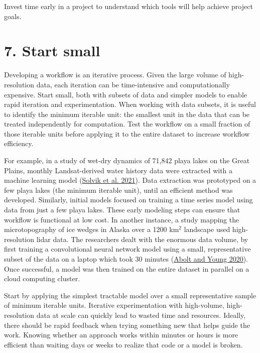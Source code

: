 \documentclass[
  12pt,
]{article}
\begin{document}
Invest time early in a project to understand which tools will help
achieve project goals.

\hypertarget{start-small}{%
\section{7. Start small}\label{start-small}}

Developing a workflow is an iterative process. Given the large volume of
high-resolution data, each iteration can be time-intensive and
computationally expensive. Start small, both with subsets of data and
simpler models to enable rapid iteration and experimentation. When
working with data subsets, it is useful to identify the minimum iterable
unit: the smallest unit in the data that can be treated independently
for computation. Test the workflow on a small fraction of those iterable
units before applying it to the entire dataset to increase workflow
efficiency.

For example, in a study of wet-dry dynamics of 71,842 playa lakes on the
Great Plains, monthly Landsat-derived water history data were extracted
with a machine learning model
(\protect\hyperlink{ref-solvik2021predicting}{Solvik et al. 2021}). Data
extraction was prototyped on a few playa lakes (the minimum iterable
unit), until an efficient method was developed. Similarly, initial
models focused on training a time series model using data from just a
few playa lakes. These early modeling steps can ensure that workflow is
functional at low cost. In another instance, a study mapping the
microtopography of ice wedges in Alaska over a 1200 km\(^2\) landscape
used high-resolution lidar data. The researchers dealt with the enormous
data volume, by first training a convolutional neural network model
using a small, representative subset of the data on a laptop which took
30 minutes (\protect\hyperlink{ref-abolt2020high}{Abolt and Young
2020}). Once successful, a model was then trained on the entire dataset
in parallel on a cloud computing cluster.

Start by applying the simplest tractable model over a small
representative sample of minimum iterable units. Iterative
experimentation with high-volume, high-resolution data at scale can
quickly lead to wasted time and resources. Ideally, there should be
rapid feedback when trying something new that helps guide the work.
Knowing whether an approach works within minutes or hours is more
efficient than waiting days or weeks to realize that code or a model is
broken.
\end{document}
